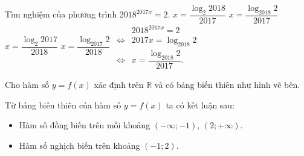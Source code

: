 \begin{ex}%
 Tìm nghiệm của phương trình $2018^{2017x} = 2$.
 \choice
  {$x = \dfrac{\log_2 2018}{2017}$}
  {\True $x = \dfrac{\log_{2018} 2}{2017}$}
  {$x = \dfrac{\log_2 2017}{2018}$}
  {$x = \dfrac{\log_{2017} 2}{2018}$}
 \loigiai
  {
  $\begin{array}{ll}
  				   & 2018^{2017x} = 2\\
   \Leftrightarrow & 2017x = \log_{2018} 2\\
   \Leftrightarrow & x = \dfrac{\log_{2018} 2}{2017}.
  \end{array}$
  }
\end{ex}


\begin{ex}%
Cho hàm số $y = f(x)$ xác định trên $\mathbb{R}$ và có bảng biến thiên như hình vẽ bên. 
  {
  }
 \loigiai
  {
  Từ bảng biến thiên của hàm số $y = f(x)$ ta có kết luận sau:
  \begin{itemize}
  \item Hàm số đồng biến trên mỗi khoảng $(-\infty;-1)$, $(2;+\infty)$.
  \item Hàm số nghịch biến trên khoảng $(-1;2)$.
  \end{itemize} }
\end{ex}


